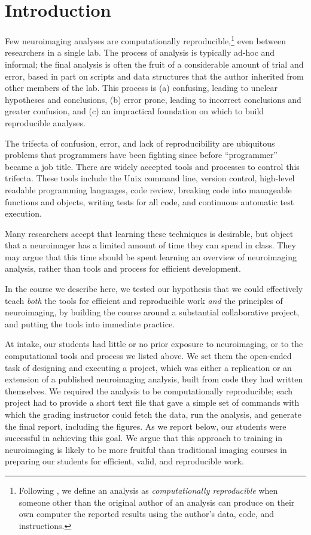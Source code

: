 \section{Introduction}

Few neuroimaging analyses are computationally reproducible,\footnote{Following
\citet{buckheit1995wavelab}, we define an analysis as \emph{computationally
reproducible} when someone other than the original author of an analysis can
produce on their own computer the reported results using the author's data,
code, and instructions.}
even between researchers in a single lab.
The process of analysis is typically ad-hoc and informal; the final analysis
is often the fruit of a considerable amount of trial and error, based in part
on scripts and data structures that the author inherited from other members of
the lab.
This process is
(a) confusing, leading to unclear hypotheses and conclusions,
(b) error prone, leading to incorrect conclusions and greater confusion,
and (c) an impractical foundation on which to build reproducible analyses.

The trifecta of confusion, error, and lack of reproducibility are ubiquitous
problems that programmers have been fighting since before ``programmer''
became a job title. There are widely accepted tools and processes to
control this trifecta. These tools include the Unix command line, version
control, high-level readable programming languages, code review, breaking code
into manageable functions and objects, writing tests for all code,  and
continuous automatic test execution.

Many researchers accept that learning these techniques is desirable, but
object that a neuroimager has a limited amount of time they can spend in
class.  They may argue that this time should be spent learning an overview of
neuroimaging analysis, rather than tools and process for efficient
development.

In the course we describe here, we tested our hypothesis that we could
effectively teach \emph{both} the tools for efficient and reproducible work \emph{and}
the principles of neuroimaging, by building the course around a substantial
collaborative project, and putting the tools into immediate practice.

At intake, our students had little or no prior exposure to neuroimaging,
or to the computational tools and process we listed above.  We set them the
open-ended task of designing and executing a project, which was either a
replication or an extension of a published neuroimaging analysis, built from
code they had written themselves.  We required the analysis to be computationally
reproducible; each project had to provide a short text file that gave a
simple set of commands with which the grading instructor could fetch the data,
run the analysis, and generate the final report, including the figures.  As we
report below, our students were successful in achieving this goal.  We argue
that this approach to training in neuroimaging is likely to be more fruitful
than traditional imaging courses in preparing our students for efficient,
valid, and reproducible work.

